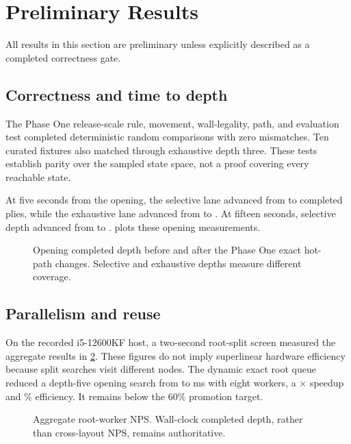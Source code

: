 \section{Preliminary Results}
All results in this section are preliminary unless explicitly described as a completed correctness gate.

\subsection{Correctness and time to depth}
The Phase One release-scale rule, movement, wall-legality, path, and evaluation test completed \ParityPositions deterministic random comparisons with zero mismatches. Ten curated fixtures also matched through exhaustive depth three. These tests establish parity over the sampled state space, not a proof covering every reachable state.

At five seconds from the opening, the selective lane advanced from \PhaseOneOldFiveSecondSelectiveDepth{} to \PhaseOneNewFiveSecondSelectiveDepth{} completed plies, while the exhaustive lane advanced from \PhaseOneOldFiveSecondVerifiedDepth{} to \PhaseOneNewFiveSecondVerifiedDepth{}. At fifteen seconds, selective depth advanced from \PhaseOneOldFifteenSecondSelectiveDepth{} to \PhaseOneNewFifteenSecondSelectiveDepth{}.  plots these opening measurements.

\begin{figure}[t]
\centering

\caption{Opening completed depth before and after the Phase One exact hot-path changes. Selective and exhaustive depths measure different coverage.}
\label{fig:time-depth}
\end{figure}

\subsection{Parallelism and reuse}
On the recorded i5-12600KF host, a two-second root-split screen measured the aggregate results in \cref{fig:workers}. These figures do not imply superlinear hardware efficiency because split searches visit different nodes. The dynamic exact root queue reduced a depth-five opening search from \DynamicRootSingleMs{} to \DynamicRootEightMs{} ms with eight workers, a \DynamicRootSpeedup$\times$ speedup and \DynamicRootEfficiency\% efficiency. It remains below the 60\% promotion target.

\begin{figure}[t]
\centering

\caption{Aggregate root-worker NPS. Wall-clock completed depth, rather than cross-layout NPS, remains authoritative.}
\label{fig:workers}
\end{figure}

